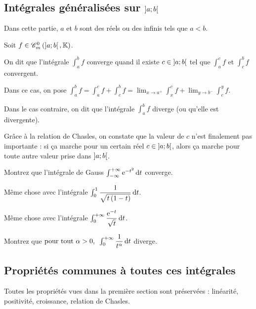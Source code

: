 \subsection{Intégrales généralisées sur \(\left]a;b\right[\)}

Dans cette partie, \(a\) et \(b\) sont des réels ou des infinis tels que \(a<b\).

\begin{defi}
Soit \(f\in\contm[\intervee{a}{b}]\).

On dit que l'intégrale \(\int_a^bf\) converge quand il existe \(c\in\left]a;b\right[\) tel que \(\int_a^cf\) et \(\int_c^bf\) convergent.

Dans ce cas, on pose \(\int_a^bf=\int_a^cf+\int_c^bf=\lim_{x\to a^+}\int_x^cf+\lim_{y\to b^-}\int_c^yf\).

Dans le cas contraire, on dit que l'intégrale \(\int_a^bf\) diverge (ou qu'elle est divergente).
\end{defi}

\begin{rem}
Grâce à la relation de Chasles, on constate que la valeur de \(c\) n'est finalement pas importante : si ça marche pour un certain réel \(c\in\left]a;b\right[\), alors ça marche pour toute autre valeur prise dans \(\left]a;b\right[\).
\end{rem}

\begin{exo}
Montrez que l'intégrale de Gauss \(\int_{\minf}^{\pinf}\e{-t^2}\odif{t}\) converge.
\end{exo}

\begin{exo}
Même chose avec l'intégrale \(\int_0^1\dfrac{1}{\sqrt{t\paren{1-t}}}\odif{t}\).
\end{exo}

\begin{exo}
Même chose avec l'intégrale \(\int_0^{\pinf}\dfrac{\e{-t}}{\sqrt{t}}\odif{t}\).
\end{exo}

\begin{exo}
Montrez que \(\quantifs{\tpt\alpha>0}\int_0^{\pinf}\dfrac{1}{t^\alpha}\odif{t}\) diverge.
\end{exo}

\subsection{Propriétés communes à toutes ces intégrales}

Toutes les propriétés vues dans la première section sont préservées : linéarité, positivité, croissance, relation de Chasles.


